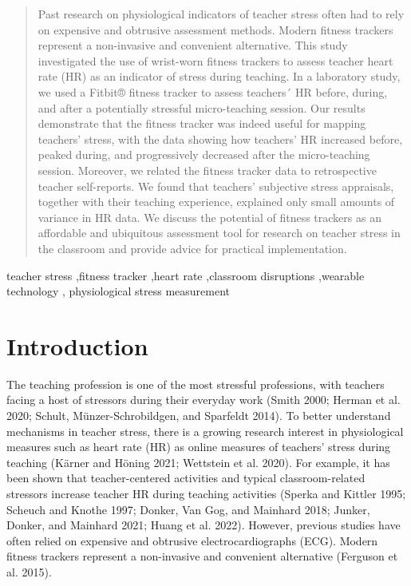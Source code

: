 \documentclass[preprint,
3p]{elsarticle} %
\begin{document}
\begin{frontmatter}
  \begin{abstract}
  Past research on physiological indicators of teacher stress often had
  to rely on expensive and obtrusive assessment methods. Modern fitness
  trackers represent a non-invasive and convenient alternative. This
  study investigated the use of wrist-worn fitness trackers to assess
  teacher heart rate (HR) as an indicator of stress during teaching. In
  a laboratory study, we used a Fitbit® fitness tracker to assess
  teachers´ HR before, during, and after a potentially stressful
  micro-teaching session. Our results demonstrate that the fitness
  tracker was indeed useful for mapping teachers' stress, with the data
  showing how teachers' HR increased before, peaked during, and
  progressively decreased after the micro-teaching session. Moreover, we
  related the fitness tracker data to retrospective teacher
  self-reports. We found that teachers' subjective stress appraisals,
  together with their teaching experience, explained only small amounts
  of variance in HR data. We discuss the potential of fitness trackers
  as an affordable and ubiquitous assessment tool for research on
  teacher stress in the classroom and provide advice for practical
  implementation.
  \end{abstract}
    \begin{keyword}
    teacher stress \sep fitness tracker \sep heart rate \sep classroom
disruptions \sep wearable technology \sep 
    physiological stress measurement
  \end{keyword}
  
 \end{frontmatter}

\section{Introduction}\label{introduction}

The teaching profession is one of the most stressful professions, with
teachers facing a host of stressors during their everyday work (Smith
2000; Herman et al. 2020; Schult, Münzer-Schrobildgen, and Sparfeldt
2014). To better understand mechanisms in teacher stress, there is a
growing research interest in physiological measures such as heart rate
(HR) as online measures of teachers' stress during teaching (Kärner and
Höning 2021; Wettstein et al. 2020). For example, it has been shown that
teacher-centered activities and typical classroom-related stressors
increase teacher HR during teaching activities (Sperka and Kittler 1995;
Scheuch and Knothe 1997; Donker, Van Gog, and Mainhard 2018; Junker,
Donker, and Mainhard 2021; Huang et al. 2022). However, previous studies
have often relied on expensive and obtrusive electrocardiographs (ECG).
Modern fitness trackers represent a non-invasive and convenient
alternative (Ferguson et al. 2015).
\end{document}
